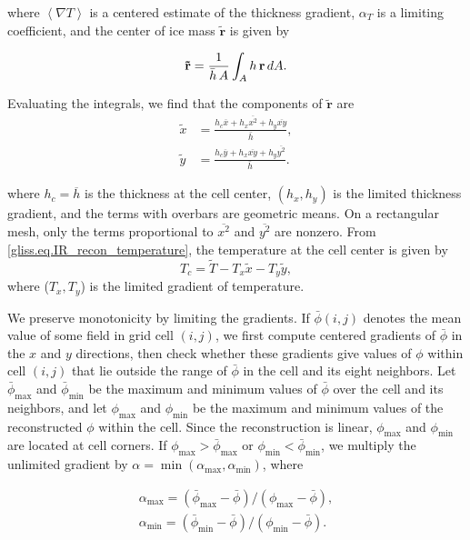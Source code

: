 \noindent
where $\left<\nabla T\right>$ is a centered estimate of the thickness
gradient, $\alpha_T$ is a limiting coefficient, and the center of ice mass
$\mathbf{\tilde{r}}$ is given by

\begin{equation}
{\bf \tilde{r}} = \frac{1}{\bar h \, A} \int_A h \, {\bf r} \, dA.
\end{equation}

\noindent
Evaluating the integrals, we find that the components of $\mathbf{\tilde{r}}$ are
\begin{equation}
  \begin{split}
    \tilde{x} & = \frac{h_c \overline{x} + h_x \overline{x^2} + h_y \overline{xy}} {\bar{h}}, \\
    \tilde{y} & = \frac{h_c \overline{y} + h_x \overline{xy} + h_y \overline{y^2}} {\bar{h}}.
  \end{split}
\end{equation}

\noindent
where $h_c = \overline{h}$ is the thickness at the cell center,
$(h_x,h_y)$ is the limited thickness gradient, and the terms with overbars are geometric
means.  On a rectangular mesh, only the terms proportional to $\overline{x^2}$ and $\overline{y^2}$
are nonzero.
From \eqref{gliss.eq.IR_recon_temperature}, the temperature at the cell center is given by
\[ T_c = \tilde{T} - T_x \tilde{x} - T_y \tilde{y}, \]
where ($T_x, T_y$) is the limited gradient of temperature.

We preserve monotonicity by limiting the gradients. If
$\bar{\phi}(i,j)$ denotes the mean value of some field in grid cell
$(i,j)$, we first compute centered gradients of $\bar{\phi}$ in
the $x$ and $y$ directions, then check whether these gradients
give values of $\phi$ within cell $(i,j)$ that lie outside the
range of $\bar{\phi}$ in the cell and its eight neighbors.  Let
$\bar{\phi}_{\max}$ and $\bar{\phi}_{\min}$ be the maximum and
minimum values of $\bar{\phi}$ over the cell and its neighbors,
and let $\phi_{\max}$ and $\phi_{\min}$ be the maximum and minimum
values of the reconstructed $\phi$ within the cell.  Since the
reconstruction is linear, $\phi_{\max}$ and $\phi_{\min}$ are
located at cell corners.  If $\phi_{\max} > \bar{\phi}_{\max}$ or
$ \phi_{\min} < \bar{\phi}_{\min}$, we multiply the unlimited
gradient by $\alpha = \min(\alpha_{\max}, \alpha_{\min})$, where

\begin{equation}
  \label{gliss.eq.IR_limited_gradient}
  \begin{split}
    \alpha_{\max} = (\bar{\phi}_{\max} - \bar{\phi}) / (\phi_{\max} -\bar{\phi}), \\
    \alpha_{\min} = (\bar{\phi}_{\min} - \bar{\phi}) / (\phi_{\min} -\bar{\phi}).
  \end{split}
\end{equation}

